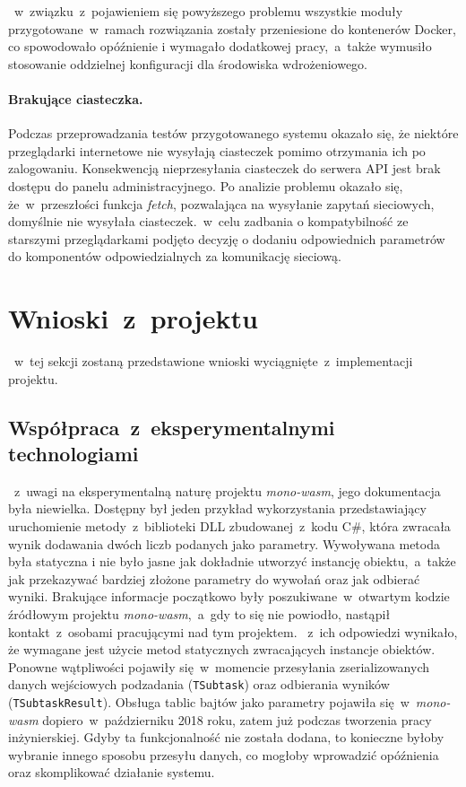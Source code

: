 \documentclass[a4paper,11pt,twoside]{report}
\theoremstyle{definition}
\begin{document}
           ~w~związku~z~pojawieniem się powyższego problemu wszystkie moduły przygotowane~w~ramach rozwiązania zostały przeniesione do kontenerów Docker, co spowodowało opóźnienie i wymagało dodatkowej pracy,~a~także wymusiło stosowanie oddzielnej konfiguracji dla środowiska wdrożeniowego.
            
        \paragraph{Brakujące ciasteczka.}
            Podczas przeprowadzania testów przygotowanego systemu okazało się, że niektóre przeglądarki internetowe nie wysyłają ciasteczek pomimo otrzymania ich po zalogowaniu.
            Konsekwencją nieprzesyłania ciasteczek do serwera API jest brak dostępu do panelu administracyjnego. Po analizie problemu okazało się, że~w~przeszłości funkcja \textit{fetch}, pozwalająca na wysyłanie zapytań sieciowych, domyślnie nie wysyłała ciasteczek.~w~celu zadbania o kompatybilność ze starszymi przeglądarkami podjęto decyzję o dodaniu odpowiednich parametrów do komponentów odpowiedzialnych za komunikację sieciową.
    
    
    \section{Wnioski~z~projektu}
        \label{wnioski-z-projektu}
       ~w~tej sekcji zostaną przedstawione wnioski wyciągnięte~z~implementacji projektu.
        
        \subsection{Współpraca~z~eksperymentalnymi technologiami}
           ~z~uwagi na eksperymentalną naturę projektu \textit{mono-wasm}, jego dokumentacja była niewielka. Dostępny był jeden przykład wykorzystania przedstawiający uruchomienie metody~z~biblioteki DLL zbudowanej~z~kodu C\#, która zwracała wynik dodawania dwóch liczb podanych jako parametry.
            Wywoływana metoda była statyczna i nie było jasne jak dokładnie utworzyć instancję obiektu,~a~także jak przekazywać bardziej złożone parametry do wywołań oraz jak odbierać wyniki.
            Brakujące informacje początkowo były poszukiwane~w~otwartym kodzie źródłowym projektu \textit{mono-wasm},~a~gdy to się nie powiodło, nastąpił kontakt~z~osobami pracującymi nad tym projektem.
           ~z~ich odpowiedzi wynikało, że wymagane jest użycie metod statycznych zwracających instancje obiektów.
            Ponowne wątpliwości pojawiły się~w~momencie przesyłania zserializowanych danych wejściowych podzadania (\texttt{TSubtask}) oraz odbierania wyników (\texttt{TSubtaskResult}). Obsługa tablic bajtów jako parametry pojawiła się~w~\textit{mono-wasm} dopiero~w~październiku 2018 roku, zatem już podczas tworzenia pracy inżynierskiej.
            Gdyby ta funkcjonalność nie została dodana, to konieczne byłoby wybranie innego sposobu przesyłu danych, co mogłoby wprowadzić opóźnienia oraz skomplikować działanie systemu.
            
\end{document}
